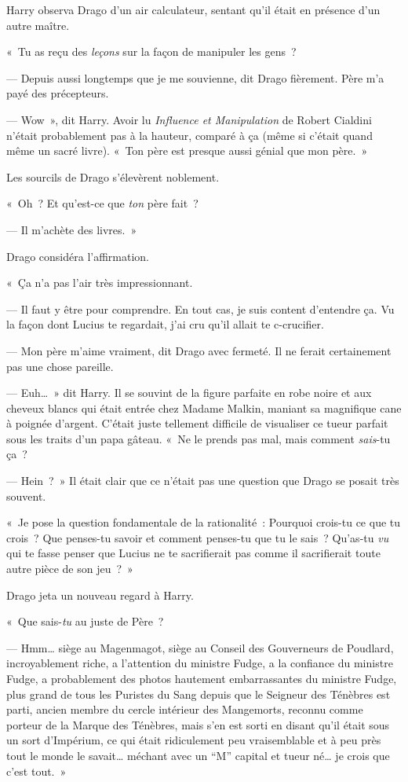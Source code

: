 Harry observa Drago d'un air calculateur, sentant qu'il était en présence d'un autre maître.

«~Tu as reçu des \emph{leçons} sur la façon de manipuler les gens~?

--- Depuis aussi longtemps que je me souvienne, dit Drago fièrement. Père m'a payé des précepteurs.

--- Wow~», dit Harry. Avoir lu \emph{Influence et Manipulation} de Robert Cialdini n'était probablement pas à la hauteur, comparé à ça (même si c'était quand même un sacré livre). «~Ton père est presque aussi génial que mon père.~»

Les sourcils de Drago s'élevèrent noblement.

«~Oh~? Et qu'est-ce que \emph{ton} père fait~?

--- Il m'achète des livres.~»

Drago considéra l'affirmation.

«~Ça n'a pas l'air très impressionnant.

--- Il faut y être pour comprendre. En tout cas, je suis content d'entendre ça. Vu la façon dont Lucius te regardait, j'ai cru qu'il allait te c-crucifier.

--- Mon père m'aime vraiment, dit Drago avec fermeté. Il ne ferait certainement pas une chose pareille.

--- Euh…~» dit Harry. Il se souvint de la figure parfaite en robe noire et aux cheveux blancs qui était entrée chez Madame Malkin, maniant sa magnifique cane à poignée d'argent. C'était juste tellement difficile de visualiser ce tueur parfait sous les traits d'un papa gâteau. «~Ne le prends pas mal, mais comment \emph{sais}-tu ça~?

--- Hein~?~» Il était clair que ce n'était pas une question que Drago se posait très souvent.

«~Je pose la question fondamentale de la rationalité~: Pourquoi crois-tu ce que tu crois~? Que penses-tu savoir et comment penses-tu que tu le sais~? Qu'as-tu \emph{vu} qui te fasse penser que Lucius ne te sacrifierait pas comme il sacrifierait toute autre pièce de son jeu~?~»

Drago jeta un nouveau regard à Harry.

«~Que sais-\emph{tu} au juste de Père~?

--- Hmm… siège au Magenmagot, siège au Conseil des Gouverneurs de Poudlard, incroyablement riche, a l'attention du ministre Fudge, a la confiance du ministre Fudge, a probablement des photos hautement embarrassantes du ministre Fudge, plus grand de tous les Puristes du Sang depuis que le Seigneur des Ténèbres est parti, ancien membre du cercle intérieur des Mangemorts, reconnu comme porteur de la Marque des Ténèbres, mais s'en est sorti en disant qu'il était sous un sort d'Impérium, ce qui était ridiculement peu vraisemblable et à peu près tout le monde le savait… méchant avec un “M” capital et tueur né… je crois que c'est tout.~»

